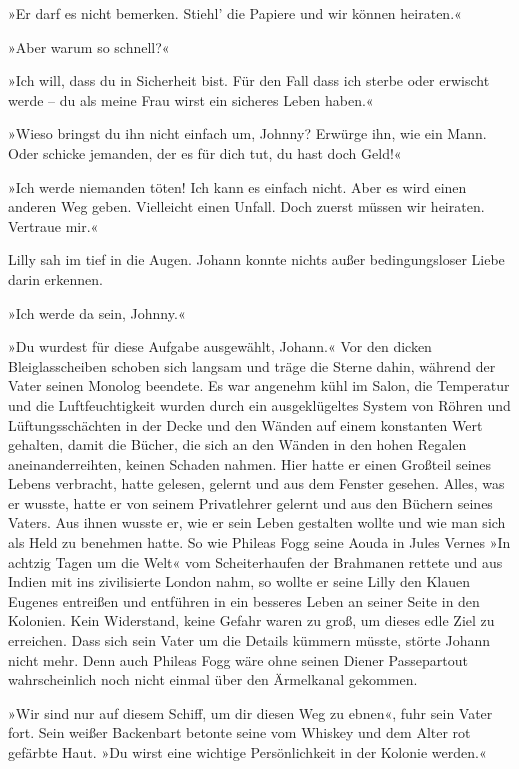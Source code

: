 »Er darf es nicht bemerken. Stiehl' die Papiere und wir können
heiraten.«

»Aber warum so schnell?«

»Ich will, dass du in Sicherheit bist. Für den Fall dass ich sterbe
oder erwischt werde – du als meine Frau wirst ein sicheres Leben
haben.«

»Wieso bringst du ihn nicht einfach um, Johnny? Erwürge ihn, wie
ein Mann. Oder schicke jemanden, der es für dich tut, du hast doch
Geld!«

»Ich werde niemanden töten! Ich kann es einfach nicht. Aber es wird
einen anderen Weg geben. Vielleicht einen Unfall. Doch zuerst
müssen wir heiraten. Vertraue mir.«

Lilly sah im tief in die Augen. Johann konnte nichts außer
bedingungsloser Liebe darin erkennen.

»Ich werde da sein, Johnny.«

\tb

»Du wurdest für diese Aufgabe ausgewählt, Johann.« Vor den dicken
Bleiglasscheiben schoben sich langsam und träge die Sterne dahin,
während der Vater seinen Monolog beendete. Es war angenehm kühl im
Salon, die Temperatur und die Luftfeuchtigkeit wurden durch ein
ausgeklügeltes System von Röhren und Lüftungsschächten in der Decke
und den Wänden auf einem konstanten Wert gehalten, damit die
Bücher, die sich an den Wänden in den hohen Regalen
aneinanderreihten, keinen Schaden nahmen. Hier hatte er einen
Großteil seines Lebens verbracht, hatte gelesen, gelernt und aus
dem Fenster gesehen. Alles, was er wusste, hatte er von seinem
Privatlehrer gelernt und aus den Büchern seines Vaters. Aus ihnen
wusste er, wie er sein Leben gestalten wollte und wie man sich als
Held zu benehmen hatte. So wie Phileas Fogg seine Aouda in Jules
Vernes »In achtzig Tagen um die Welt« vom Scheiterhaufen der
Brahmanen rettete und aus Indien mit ins zivilisierte London nahm,
so wollte er seine Lilly den Klauen Eugenes entreißen und entführen
in ein besseres Leben an seiner Seite in den Kolonien. Kein
Widerstand, keine Gefahr waren zu groß, um dieses edle Ziel zu
erreichen. Dass sich sein Vater um die Details kümmern müsste,
störte Johann nicht mehr. Denn auch Phileas Fogg wäre ohne seinen
Diener Passepartout wahrscheinlich noch nicht einmal über den
Ärmelkanal gekommen.

»Wir sind nur auf diesem Schiff, um dir diesen Weg zu ebnen«, fuhr
sein Vater fort. Sein weißer Backenbart betonte seine vom Whiskey
und dem Alter rot gefärbte Haut. »Du wirst eine wichtige
Persönlichkeit in der Kolonie werden.«

